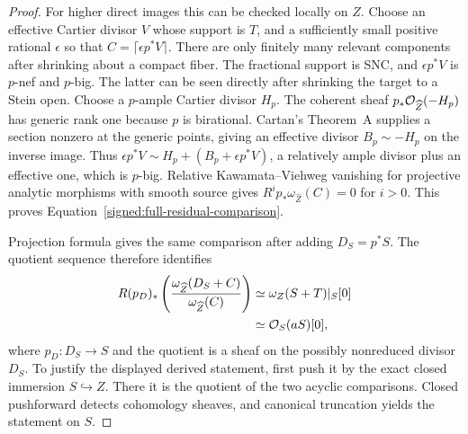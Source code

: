 \begin{proof}
For higher direct images this can be checked locally on \(Z\).
Choose an effective Cartier divisor \(V\) whose support is
\(T\), and a sufficiently small positive rational \(\epsilon\)
so that \(C=\lceil\epsilon p^*V\rceil\).  There are only
finitely many relevant components after shrinking about a
compact fiber.  The fractional support is SNC, and
\(\epsilon p^*V\) is \(p\)-nef and \(p\)-big.  The latter
can be seen directly after shrinking the target to a Stein
open.  Choose a \(p\)-ample Cartier divisor \(H_p\).  The
coherent sheaf \(p_*\mathcal O_{\widehat Z}(-H_p)\) has generic
rank one because \(p\) is birational.  Cartan's Theorem~A
supplies a section nonzero at the generic points, giving an
effective divisor \(B_p\sim-H_p\) on the inverse image.
Thus \(\epsilon p^*V\sim H_p+(B_p+\epsilon p^*V)\), a
relatively ample divisor plus an effective one, which is
\(p\)-big.
Relative Kawamata--Viehweg vanishing for projective analytic
morphisms with smooth source
\cite[Theorem~5.1]{FujinoAnalyticBCHM} gives
\(R^ip_*\omega_{\widehat Z}(C)=0\) for \(i>0\).  This
proves Equation~\eqref{signed:full-residual-comparison}.

Projection formula gives the same comparison after adding
\(D_S=p^*S\).  The quotient sequence therefore identifies
\[
\begin{aligned}
 R(p_D)_*\left(
 \frac{\omega_{\widehat Z}(D_S+C)}{\omega_{\widehat Z}(C)}
 \right)
 &\simeq \omega_Z(S+T)|_S[0]\\
 &\simeq \mathcal O_S(aS)[0],
\end{aligned}
\]
where \(p_D:D_S\to S\) and the quotient is a sheaf on the
possibly nonreduced divisor \(D_S\).  To justify the displayed
derived statement, first push it by the exact closed immersion
\(S\hookrightarrow Z\).  There it is the quotient of the two
acyclic comparisons.  Closed pushforward detects cohomology
sheaves, and canonical truncation yields the statement on \(S\).


\end{proof}
